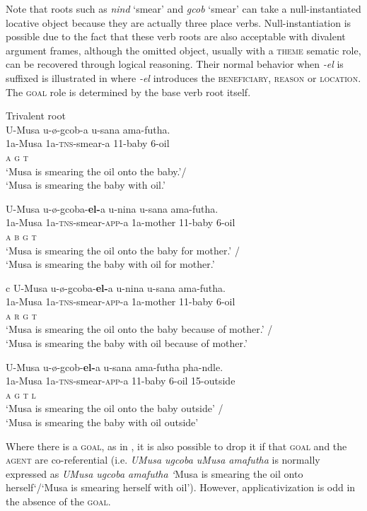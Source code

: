 \documentclass[output=paper]{langsci/langscibook}
\begin{document}
Note that roots such as \textit{nind} ‘smear’ and \textit{gcob} ‘smear’ can take a null-instantiated locative object because they are actually three place verbs. Null-instantiation is possible due to the fact that these verb roots are also acceptable with divalent argument frames, although the omitted object, usually with a \textsc{theme }sematic role, can be recovered through logical reasoning. Their normal behavior when \textit{-el} is suffixed is illustrated in  where \textit{-el} introduces the \textsc{beneficiary}, \textsc{reason} or \textsc{location}. The \textsc{goal} role is determined by the base verb root itself.

\ea
{Trivalent root}\\
\ea
\gll U-Musa u-ø-gcob-a u-sana ama-futha. \\
 1a-Musa 1a-\textsc{tns}-smear-a 11-baby 6-oil\\
 \textsc{a g t}\\
\glt ‘Musa is smearing the oil onto the baby.’/\\
 ‘Musa is smearing the baby with oil.’

\ex
\gll U-Musa u-ø-gcoba-\textbf{el-}a u-nina u-sana ama-futha. \\
 1a-Musa 1a-\textsc{tns}-smear-\textsc{app}-a 1a-mother 11-baby 6-oil\\
 \textsc{a b g t}\\
\glt ‘Musa is smearing the oil onto the baby for mother.’ /\\
‘Musa is smearing the baby with oil for mother.’

\ex
\gll c U-Musa u-ø-gcoba-\textbf{el-}a u-nina u-sana ama-futha. \\
 1a-Musa 1a-\textsc{tns}-smear-\textsc{app}-a 1a-mother 11-baby 6-oil\\
 \textsc{a r g t}\\
\glt ‘Musa is smearing the oil onto the baby because of mother.’ /\\
 ‘Musa is smearing the baby with oil because of mother.’

\ex
\gll U-Musa u-ø-gcob-\textbf{el-}a u-sana ama-futha pha-ndle. \\
 1a-Musa 1a-\textsc{tns}-smear-\textsc{app}-a 11-baby 6-oil 15-outside\\
 \textsc{a g t l}\\
\glt ‘Musa is smearing the oil onto the baby outside’ / \\
‘Musa is smearing the baby with oil outside’ 
\z
\z

Where there is a \textsc{goal,} as in , it is also possible to drop it if that \textsc{goal} and the \textsc{agent} are co-referential (i.e. \textit{UMusa ugcoba uMusa amafutha} is normally expressed as \textit{UMusa ugcoba amafutha ‘}Musa is smearing the oil onto herself‘/‘Musa is smearing herself with oil’). However, applicativization is odd in the absence of the \textsc{goal.}
\end{document}
